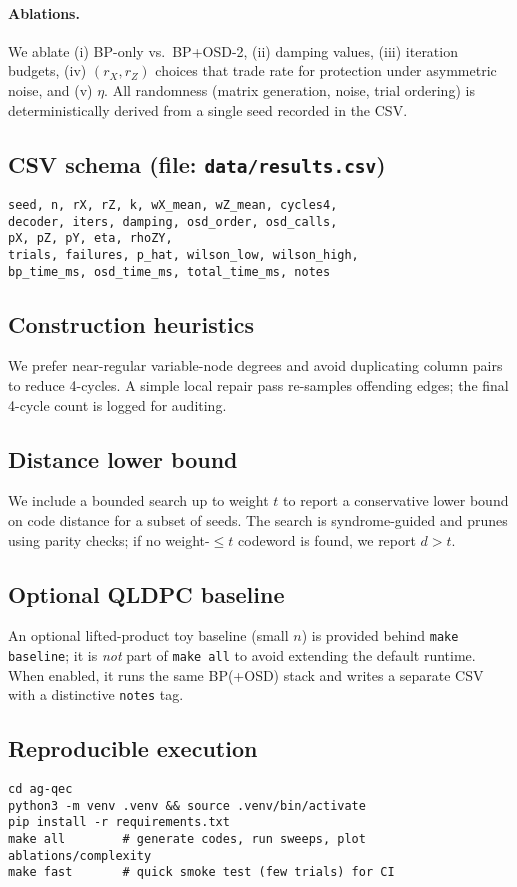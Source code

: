 \paragraph{Ablations.}
We ablate (i) BP-only vs.\ BP+OSD-2, (ii) damping values, (iii) iteration budgets, (iv) $(r_X,r_Z)$ choices that trade rate for protection under asymmetric noise, and (v) $\eta$.
All randomness (matrix generation, noise, trial ordering) is deterministically derived from a single seed recorded in the CSV.

\subsection*{CSV schema (file: \texttt{data/results.csv})}
\begin{small}
\begin{verbatim}
seed, n, rX, rZ, k, wX_mean, wZ_mean, cycles4,
decoder, iters, damping, osd_order, osd_calls,
pX, pZ, pY, eta, rhoZY,
trials, failures, p_hat, wilson_low, wilson_high,
bp_time_ms, osd_time_ms, total_time_ms, notes
\end{verbatim}
\end{small}

\subsection*{Construction heuristics}
We prefer near-regular variable-node degrees and avoid duplicating column pairs to reduce 4-cycles. A simple local repair pass re-samples offending edges; the final 4-cycle count is logged for auditing.

\subsection*{Distance lower bound}
We include a bounded search up to weight $t$ to report a conservative lower bound on code distance for a subset of seeds. The search is syndrome-guided and prunes using parity checks; if no weight-$\le t$ codeword is found, we report $d>t$.

\subsection*{Optional QLDPC baseline}
An optional lifted-product toy baseline (small $n$) is provided behind \texttt{make baseline}; it is \emph{not} part of \texttt{make all} to avoid extending the default runtime. When enabled, it runs the same BP(+OSD) stack and writes a separate CSV with a distinctive \texttt{notes} tag.

\subsection*{Reproducible execution}
\begin{verbatim}
cd ag-qec
python3 -m venv .venv && source .venv/bin/activate
pip install -r requirements.txt
make all        # generate codes, run sweeps, plot ablations/complexity
make fast       # quick smoke test (few trials) for CI
\end{verbatim}

